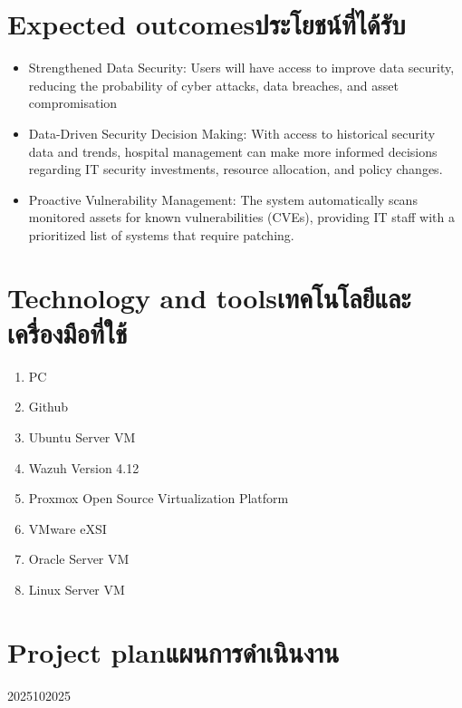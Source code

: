 \section{\ifenglish Expected outcomes\else ประโยชน์ที่ได้รับ\fi}
\begin{itemize}
    \item{Strengthened Data Security: Users will have access to improve data security, reducing the probability of cyber attacks, data breaches, and asset compromisation}
    \item{Data-Driven Security Decision Making: With access to historical security data and trends, hospital management can make more informed decisions regarding IT security investments, resource allocation, and policy changes.}
    \item{Proactive Vulnerability Management: The system automatically scans monitored assets for known vulnerabilities (CVEs), providing IT staff with a prioritized list of systems that require patching.}
\end{itemize}

\section{\ifenglish Technology and tools\else เทคโนโลยีและเครื่องมือที่ใช้\fi}
\begin{enumerate}
    \item{PC}
    \item{Github}
    \item{Ubuntu Server VM}
    \item{Wazuh Version 4.12}
    \item{Proxmox Open Source Virtualization Platform}
    \item{VMware eXSI}
    \item{Oracle Server VM}
    \item{Linux Server VM}
\end{enumerate}

\section{\ifenglish Project plan\else แผนการดำเนินงาน\fi}

\begin{plan}{6}{2025}{10}{2025}
\end{plan}


